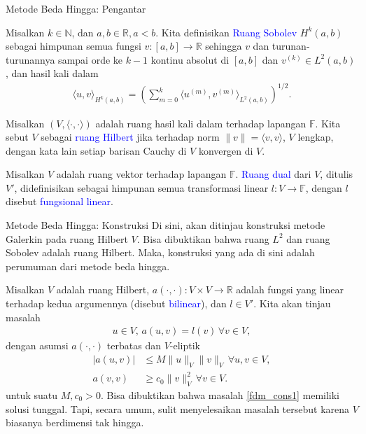 \documentclass[xcolor={dvipsnames}, 9pt]{beamer}
\renewcommand{\emph}[1]{\textcolor{Blue}{#1}}
\begin{document}
	\begin{frame}{Metode Beda Hingga: Pengantar}
		\begin{definition}
			Misalkan $k\in\mathbb{N}$, dan $a,b\in\mathbb{R}, a<b$. Kita definisikan \emph{Ruang Sobolev} $H^k(a,b)$ sebagai himpunan semua fungsi $v:[a,b]\to\mathbb{R}$ sehingga $v$ dan turunan-turunannya sampai orde ke $k-1$ kontinu absolut di $[a,b]$ dan $v^{(k)}\in L^2(a,b)$, dan hasil kali dalam
			\begin{align*}
				\langle u,v\rangle_{H^k(a,b)} = \left(\sum_{m=0}^{k}\langle u^{(m)},v^{(m)}\rangle_{L^2(a,b)}\right)^{1/2}.
			\end{align*}
		\end{definition}
		\begin{definition}
			Misalkan $(V,\langle\cdot,\cdot\rangle)$ adalah ruang hasil kali dalam terhadap lapangan $\mathbb{F}$. Kita sebut $V$ sebagai \emph{ruang Hilbert} jika terhadap norm $\|v\|=\langle v,v\rangle$, $V$ lengkap, dengan kata lain setiap barisan Cauchy di $V$ konvergen di $V$.
		\end{definition}
		\begin{definition}
			Misalkan $V$ adalah ruang vektor terhadap lapangan $\mathbb{F}$. \emph{Ruang dual} dari $V$, ditulis $V'$, didefinisikan sebagai himpunan semua transformasi linear $l:V\to\mathbb{F}$, dengan $l$ disebut \emph{fungsional linear}.
		\end{definition}
	\end{frame}
	\begin{frame}{Metode Beda Hingga: Konstruksi}
		Di sini, akan ditinjau konstruksi metode Galerkin pada ruang Hilbert $V$. Bisa dibuktikan bahwa ruang $L^2$ dan ruang Sobolev adalah ruang Hilbert. Maka, konstruksi yang ada di sini adalah perumuman dari metode beda hingga. \par
		Misalkan $V$ adalah ruang Hilbert, $a(\cdot,\cdot):V\times V\to \mathbb{R}$ adalah fungsi yang linear terhadap kedua argumennya (disebut \emph{bilinear}), dan $l\in V'$. Kita akan tinjau masalah
		\begin{align}\label{fdm_cons1}
			u\in V, \, a(u,v) = l(v) \, \forall v\in V,
		\end{align}
		dengan asumsi $a(\cdot,\cdot)$ terbatas dan $V$-eliptik
		\begin{align}
			|a(u,v)|&\leq M\|u\|_V\|v\|_V \, \forall u,v\in V, \label{fdm_cons2} \\
			a(v,v) &\geq c_0\|v\|_V^2 \, \forall v\in V. \label{fdm_cons3}
		\end{align}
		untuk suatu $M,c_0>0$. Bisa dibuktikan bahwa masalah \eqref{fdm_cons1} memiliki solusi tunggal. Tapi, secara umum, sulit menyelesaikan masalah tersebut karena $V$ biasanya berdimensi tak hingga. 
	\end{frame}
\end{document}
